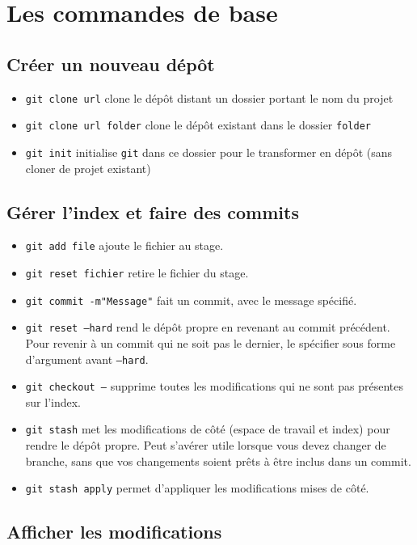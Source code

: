 \documentclass[french]{report}
\newcommand\itemb{\item[$\bullet$]}
\begin{document}
\section{Les commandes de base}

\subsection{Créer un nouveau dépôt}

\begin{itemize}
   \itemb \texttt{git clone url} clone le dépôt distant un dossier portant le nom du projet
    \itemb \texttt{git clone url folder} clone le dépôt existant dans le dossier \texttt{folder}
    \itemb \texttt{git init} initialise \texttt{git} dans ce dossier pour le transformer en dépôt (sans cloner de projet existant)
\end{itemize}

\subsection{Gérer l'index et faire des commits}

\begin{itemize}
    \itemb \texttt{git add file} ajoute le fichier au stage.
    \itemb \texttt{git reset fichier} retire le fichier du stage.
    \itemb \texttt{git commit -m"Message"} fait un commit, avec le message spécifié.
    \itemb \texttt{git reset ---hard} rend le dépôt propre en revenant au commit précédent.
    Pour revenir à un commit qui ne soit pas le dernier, le spécifier sous forme d'argument avant \texttt{---hard}.
    \itemb \texttt{git checkout ---} supprime toutes les modifications qui ne sont pas présentes sur l'index.
    \itemb \texttt{git stash} \label{cmd:stash} met les modifications de côté (espace de travail et index) pour rendre le dépôt propre.
    Peut s'avérer utile lorsque vous devez changer de branche, sans que vos changements soient prêts à être inclus dans un commit.
    \itemb \texttt{git stash apply} permet d'appliquer les modifications mises de côté.
\end{itemize}

\subsection{Afficher les modifications}
\end{document}
